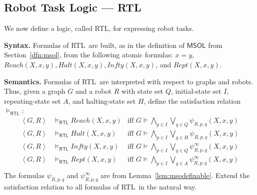 \documentclass{aamas2015}
\def\RTL{\textsf{RTL}}
\newcommand{\tup}[1]{\overline{#1}}
\newcommand{\tpl}[1]{\left<{#1}\right>}
\def\msol{\mathsf{MSOL}}
\begin{document}
\subsection{Robot Task Logic --- \RTL} \label{sec:RTL}

We now define a logic, called \RTL, for expressing robot tasks. 

{\bf Syntax.} Formulas of \RTL\ are built, as in the definition of $\msol$ from Section~\ref{dfn:msol}, from the following atomic formulas: $x=y$, $Reach(X,x,y),Halt(X,x,y),Infty(X,x,y)$, and $Rept(X,x,y)$. 


{\bf Semantics.} Formulas of \RTL\ are interpreted with respect to graphs and robots. Thus, given a graph $G$ and a robot $R$ with state set $Q$, initial-state set $I$, repeating-state set $A$, and halting-state set $H$, define the satisfaction relation $\models_\RTL$:
\begin{align*}
\tpl{G,{R}} &\models_\RTL Reach({X},{x},{y}) & \textrm{iff } G \models \bigwedge_{{p} \in I} \bigvee_{{q} \in Q} \psi_{{R},{p},{q}}({X},{x},{y})\\
%
\tpl{G,{R}} &\models_\RTL Halt({X},{x},{y}) & \textrm{iff } G \models \bigwedge_{{p} \in I} \bigvee_{{q} \in H} \psi_{{R},{p},{q}}({X},{x},{y})\\
%
\tpl{G,{R}} &\models_\RTL Infty({X},{x},{y}) & \textrm{iff } G \models \bigwedge_{{p} \in I} \bigvee_{{q} \in Q} \psi^\infty_{{R},{p},{q}}({X},{x},{y})\\
%
\tpl{G,{R}}& \models_\RTL Rept({X},{x},{y}) & \textrm{iff } G \models \bigwedge_{{p} \in I} \bigvee_{{q} \in A} \psi^\infty_{{R},{p},{q}}({X},{x},{y})\\
\end{align*}
The formulas $\psi_{{R},{p},{q}}$ and $\psi^\infty_{{R},{p},{q}}$ are from Lemma~\ref{lem:msodefinable}. Extend the satisfaction relation to all formulas of \RTL\ in the natural way.
\end{document}
